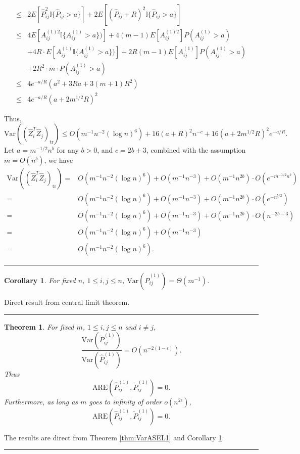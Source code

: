 \documentclass[a4paper]{article}
\newenvironment{proof}{{\bf Proof:  }}{\hfill\rule{2mm}{2mm}}
\newtheorem{theorem}[fact]{Theorem}
\newtheorem{corollary}[fact]{Corollary}
\begin{document}
\begin{proof}
\begin{align*}
	\le & 2 E[\hat{P}_{ij}^2 \mathbb{I}\{\hat{P}_{ij} > a\}] + 2 E[(\hat{P}_{ij} + R)^2 \mathbb{I}\{\hat{P}_{ij} > a\}] \\
	\le & 4 E[A_{ij}^{(1)2} \mathbb{I} \{ A_{ij}^{(1)} > a \})] + 4(m-1) E[A_{ij}^{(1)2}] P(A_{ij}^{(1)} > a) \\
	& + 4R \cdot E[A_{ij}^{(1)} \mathbb{I} \{ A_{ij}^{(1)} > a \})] + 2R(m-1) E[A_{ij}^{(1)}] P(A_{ij}^{(1)} > a) \\
	& + 2R^2 \cdot m \cdot P(A_{ij}^{(1)} > a) \\
	\le & 4 e^{-a/R} \left( a^2 + 3R a + 3(m+1)R^2 \right) \\
	\le & 4 e^{-a/R} (a + 2 m^{1/2} R)^2
\end{align*}

Thus,
\[
	\mathrm{Var}((\hat{Z}_i^T \hat{Z}_j)_{\mathrm{tr}}) \le
	O(m^{-1} n^{-2} (\log n)^6) + 16 (a+R)^2 n^{-c} + 16 (a+2 m^{1/2} R)^2 e^{-a/R}.
\]
Let $a = m^{-1/2} n^{b}$ for any $b > 0$, and $c = 2b + 3$, combined with the assumption $m = O(n^{b})$, we have
\begin{align*}
	\mathrm{Var}((\hat{Z}_i^T \hat{Z}_j)_{\mathrm{tr}})
	= & O(m^{-1} n^{-2} (\log n)^6) + O(m^{-1} n^{-3}) + O(m^{-1} n^{2b}) \cdot O(e^{-m^{-1/2} n^{b}}) \\
	= & O(m^{-1} n^{-2} (\log n)^6) + O(m^{-1} n^{-3}) + O(m^{-1} n^{2b}) \cdot O(e^{- n^{b/2}}) \\
	= & O(m^{-1} n^{-2} (\log n)^6) + O(m^{-1} n^{-3}) + O(m^{-1} n^{2b}) \cdot O(n^{-2b-3}) \\
	= & O(m^{-1} n^{-2} (\log n)^6) + O(m^{-1} n^{-3}) \\
	= & O(m^{-1} n^{-2} (\log n)^6).
\end{align*}
\end{proof}



\begin{corollary}
\label{cor:VarL1}
For fixed $n$, $1 \le i,j \le n$, $\mathrm{Var}(\hat{P}^{(1)}_{ij}) = \Theta(m^{-1})$.
\end{corollary}
\begin{proof}
Direct result from central limit theorem.
\end{proof}




\begin{theorem}
\label{thm:AREL1}
For fixed $m$, $1 \le i, j \le n$ and $i \ne j$,
\[
	\frac{\mathrm{Var}(\widetilde{P}_{ij}^{(1)})}{\mathrm{Var}(\hat{P}_{ij}^{(1)})}
    = O(n^{-2(1-\epsilon)}).
\]
Thus
\[
	\mathrm{ARE}(\hat{P}_{ij}^{(1)}, \widetilde{P}_{ij}^{(1)}) = 0.
\]
Furthermore, as long as $m$ goes to infinity of order $o(n^{2\epsilon})$,
\[
	\mathrm{ARE}(\hat{P}_{ij}^{(1)}, \widetilde{P}_{ij}^{(1)}) = 0.
\]
\end{theorem}
\begin{proof}
The results are direct from Theorem \ref{thm:VarASEL1} and Corollary \ref{cor:VarL1}.
\end{proof}
\end{document}
